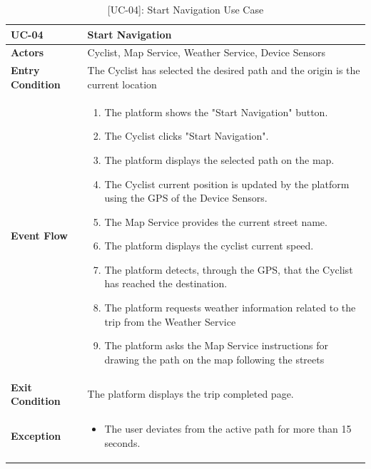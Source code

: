 \begin{table}[H]
    \centering
    \setlength\extrarowheight{2pt}
    \renewcommand{\arraystretch}{1.2}
    \begin{tabularx}{\textwidth}{|>{\bfseries}l|X|}
    \hline
    UC-04 & Start Navigation \\ \hline
    Actors & Cyclist, Map Service, Weather Service, Device Sensors\\ \hline
    Entry Condition & The Cyclist has selected the desired path and the origin is the current location\\ \hline
    Event Flow & 
    \begin{enumerate}
      \item The platform shows the "Start Navigation" button.
      \item The Cyclist clicks "Start Navigation".
      \item The platform displays the selected path on the map.
      \item The Cyclist current position is updated by the platform using the GPS of the Device Sensors.
      \item The Map Service provides the current street name.
      \item The platform displays the cyclist current speed.
      \item The platform detects, through the GPS, that the Cyclist has reached the destination.
      \item The platform requests weather information related to the trip from the Weather Service
      \item The platform asks the Map Service instructions for drawing the path on the map following the streets
    \end{enumerate}
    \\ \hline
    Exit Condition &  The platform displays the trip completed page.\\ \hline
    Exception & 
    \begin{itemize}
        \item The user deviates from the active path for more than 15 seconds.
    \end{itemize}
    \\ \hline
   \end{tabularx}
   \caption{[UC-04]: Start Navigation Use Case}
    \label{UC-04}
\end{table}

